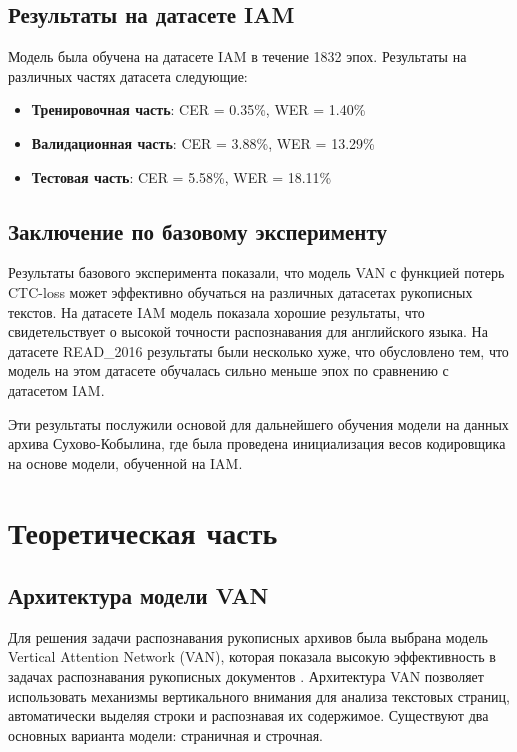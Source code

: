 \documentclass{extarticle}
\begin{document}
\subsection{Результаты на датасете IAM}

Модель была обучена на датасете IAM в течение 1832 эпох. Результаты на различных частях датасета следующие:

\begin{itemize}
	\item \textbf{Тренировочная часть}: CER = 0.35\%, WER = 1.40\%
	\item \textbf{Валидационная часть}: CER = 3.88\%, WER = 13.29\%
	\item \textbf{Тестовая часть}: CER = 5.58\%, WER = 18.11\%
\end{itemize}

\subsection{Заключение по базовому эксперименту}

Результаты базового эксперимента показали, что модель VAN с функцией потерь CTC-loss может эффективно обучаться на различных датасетах рукописных текстов. На датасете IAM модель показала хорошие результаты, что свидетельствует о высокой точности распознавания для английского языка. На датасете READ\_2016 результаты были несколько хуже, что обусловлено тем, что модель на этом датасете обучалась сильно меньше эпох по сравнению с датасетом IAM.

Эти результаты послужили основой для дальнейшего обучения модели на данных архива Сухово-Кобылина, где была проведена инициализация весов кодировщика на основе модели, обученной на IAM.

\section{Теоретическая часть}

\subsection{Архитектура модели VAN}

Для решения задачи распознавания рукописных архивов была выбрана модель Vertical Attention Network (VAN), которая показала высокую эффективность в задачах распознавания рукописных документов \cite{VAN}. Архитектура VAN позволяет использовать механизмы вертикального внимания для анализа текстовых страниц, автоматически выделяя строки и распознавая их содержимое. Существуют два основных варианта модели: страничная и строчная.
\end{document}
